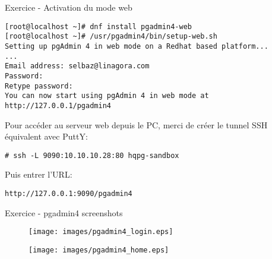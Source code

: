 \begin{frame}[fragile]{Exercice - Activation du mode web}

   \begin{itemize}

\begin{tiny}
\begin{Verbatim}[commandchars=\\\{\}]
[root@localhost ~]# dnf install pgadmin4-web
[root@localhost ~]# /usr/pgadmin4/bin/setup-web.sh
Setting up pgAdmin 4 in web mode on a Redhat based platform...
...
Email address: selbaz@linagora.com
Password: 
Retype password:
You can now start using pgAdmin 4 in web mode at http://127.0.0.1/pgadmin4
\end{Verbatim}
\end{tiny}

Pour accéder au serveur web depuis le PC, merci de créer le tunnel SSH équivalent avec PuttY:
\begin{tiny}
\begin{Verbatim}[commandchars=\\\{\}]
# ssh -L 9090:10.10.10.28:80 hqpg-sandbox
\end{Verbatim}
\end{tiny}

Puis entrer l'URL:
\begin{tiny}
\begin{Verbatim}[commandchars=\\\{\}]
http://127.0.0.1:9090/pgadmin4
\end{Verbatim}
\end{tiny}

\end{itemize}

\end{frame}


\begin{frame}[fragile]{Exercice - pgadmin4 screenshots}

\begin{figure}
\begin{center}
\texttt{[image: images/pgadmin4\_login.eps]}
\end{center}
\end{figure}

\begin{figure}
\begin{center}
\texttt{[image: images/pgadmin4\_home.eps]}
\end{center}
\end{figure}

\end{frame}

